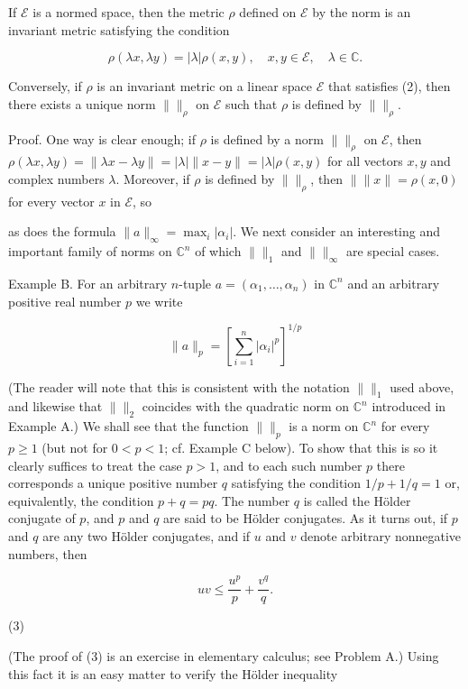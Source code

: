 If $\mathcal{E}$ is a normed space, then the metric $\rho$ defined on $\mathcal{E}$ by the norm is an invariant metric satisfying the condition

$$\rho(\lambda x, \lambda y) = |\lambda| \rho(x, y), \quad x, y \in \mathcal{E}, \quad \lambda \in \mathbb{C}.$$

Conversely, if $\rho$ is an invariant metric on a linear space $\mathcal{E}$ that satisfies (2), then there exists a unique norm $\|\|_{\rho}$ on $\mathcal{E}$ such that $\rho$ is defined by $\|\|_{\rho}$.

Proof. One way is clear enough; if $\rho$ is defined by a norm $\|\|_{\rho}$ on $\mathcal{E}$, then $\rho(\lambda x, \lambda y) = \|\lambda x - \lambda y\| = |\lambda| \|x - y\| = |\lambda| \rho(x, y)$ for all vectors $x, y$ and complex numbers $\lambda$. Moreover, if $\rho$ is defined by $\|\|_{\rho}$, then $\|\|x\| = \rho(x, 0)$ for every vector $x$ in $\mathcal{E}$, so

as does the formula $\|a\|_\infty = \max_i |\alpha_i|$. We next consider an interesting and important family of norms on $\mathbb{C}^n$ of which $\| \|_1$ and $\| \|_\infty$ are special cases.

Example B. For an arbitrary $n$-tuple $a = (\alpha_1, \ldots, \alpha_n)$ in $\mathbb{C}^n$ and an arbitrary positive real number $p$ we write

$$\|a\|_p = \left[ \sum_{i=1}^{n} |\alpha_i|^p \right]^{1/p}$$

(The reader will note that this is consistent with the notation $\| \|_1$ used above, and likewise that $\| \|_2$ coincides with the quadratic norm on $\mathbb{C}^n$ introduced in Example A.) We shall see that the function $\| \|_p$ is a norm on $\mathbb{C}^n$ for every $p \geq 1$ (but not for $0 < p < 1$; cf. Example C below). To show that this is so it clearly suffices to treat the case $p > 1$, and to each such number $p$ there corresponds a unique positive number $q$ satisfying the condition $1/p + 1/q = 1$ or, equivalently, the condition $p + q = pq$. The number $q$ is called the Hölder conjugate of $p$, and $p$ and $q$ are said to be Hölder conjugates. As it turns out, if $p$ and $q$ are any two Hölder conjugates, and if $u$ and $v$ denote arbitrary nonnegative numbers, then

$$uv \leq \frac{u^p}{p} + \frac{v^q}{q}.$$

(3)

(The proof of (3) is an exercise in elementary calculus; see Problem A.) Using this fact it is an easy matter to verify the Hölder inequality

